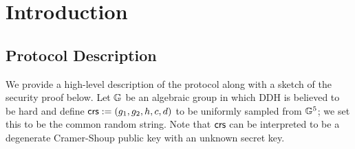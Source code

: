 \section{Introduction}
\subsection{Protocol Description}
 

We provide a high-level description of the protocol along with a sketch of the security proof below. Let $\mathbb{G}$ be an algebraic group in which DDH is believed to be hard and define $\mathsf{crs} := (g_1, g_2, h, c, d)$ to be uniformly sampled from $\mathbb{G}^5$; we set this to be the common random string. Note that $\mathsf{crs}$ can be interpreted to be a degenerate Cramer-Shoup public key with an unknown secret key.

